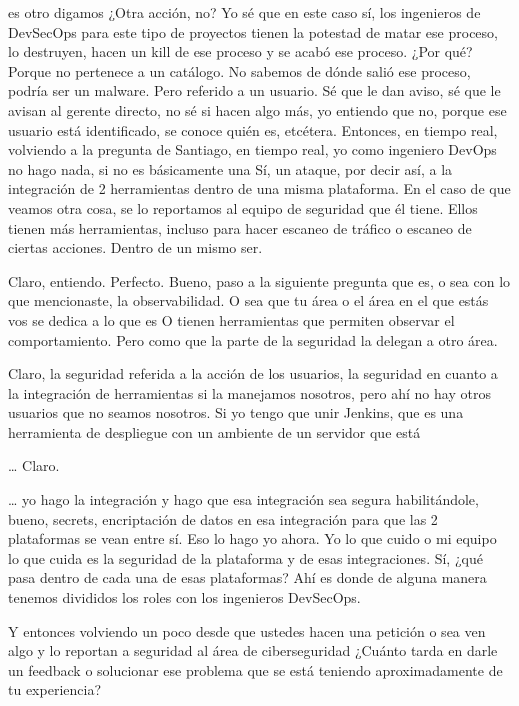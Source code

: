 \begin{description}[leftmargin=0cm, labelsep=0.5cm]
es otro digamos ¿Otra acción, no? Yo sé que en este caso sí, los ingenieros de DevSecOps para este tipo de proyectos tienen la potestad de matar ese proceso, lo destruyen, hacen un kill de ese proceso y se acabó ese proceso. ¿Por qué? Porque no pertenece a un catálogo. No sabemos de dónde salió ese proceso, podría ser un malware. Pero referido a un usuario. Sé que le dan aviso, sé que le avisan al gerente directo, no sé si hacen algo más, yo entiendo que no, porque ese usuario está identificado, se conoce quién es, etcétera. Entonces, en tiempo real, volviendo a la pregunta de Santiago, en tiempo real, yo como ingeniero DevOps no hago nada, si no es básicamente una Sí, un ataque, por decir así, a la integración de 2 herramientas dentro de una misma plataforma. En el caso de que veamos otra cosa, se lo reportamos al equipo de seguridad que él tiene. Ellos tienen más herramientas, incluso para hacer escaneo de tráfico o escaneo de ciertas acciones. Dentro de un mismo ser.

    \item[\textbf{MUNTAABSKI FEDERICO:}] Claro, entiendo. Perfecto. Bueno, paso a la siguiente pregunta que es, o sea con lo que mencionaste, la observabilidad. O sea que tu área o el área en el que estás vos se dedica a lo que es O tienen herramientas que permiten observar el comportamiento. Pero como que la parte de la seguridad la delegan a otro área.

    \item[\textbf{VILLARINO PABLO RODOLFO:}] Claro, la seguridad referida a la acción de los usuarios, la seguridad en cuanto a la integración de herramientas si la manejamos nosotros, pero ahí no hay otros usuarios que no seamos nosotros. Si yo tengo que unir Jenkins, que es una herramienta de despliegue con un ambiente de un servidor que está

    \item[\textbf{MUNTAABSKI FEDERICO:}] … Claro.

    \item[\textbf{VILLARINO PABLO RODOLFO:}] … yo hago la integración y hago que esa integración sea segura habilitándole, bueno, secrets, encriptación de datos en esa integración para que las 2 plataformas se vean entre sí. Eso lo hago yo ahora. Yo lo que cuido o mi equipo lo que cuida es la seguridad de la plataforma y de esas integraciones. Sí, ¿qué pasa dentro de cada una de esas plataformas? Ahí es donde de alguna manera tenemos divididos los roles con los ingenieros DevSecOps.

    \item[\textbf{MOCIULSKY SANTIAGO:}] Y entonces volviendo un poco desde que ustedes hacen una petición o sea ven algo y lo reportan a seguridad al área de ciberseguridad ¿Cuánto tarda en darle un feedback o solucionar ese problema que se está teniendo aproximadamente de tu experiencia?


\end{description}

